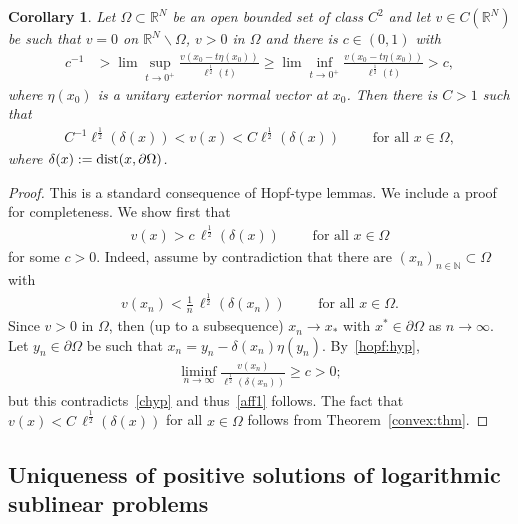 \documentclass[11pt]{article}
\newcommand{\R}{\mathbb{R}}
\newcommand{\N}{\mathbb{N}}
\numberwithin{equation}{section}
\newtheorem{corollary}[theorem]{Corollary}
\DeclareMathOperator{\dist}{\rm dist}
\begin{document}
\begin{corollary}\label{cor:hopf}
Let $\Omega\subset \R^N$ be an open bounded set of class $C^2$ and let $v\in C(\mathbb{R}^{N})$ be such that $v=0$ on $\R^N\backslash \Omega$, $v>0$ in $\Omega$ and there is $c\in(0,1)$ with
\begin{align}\label{hopf:hyp}
c^{-1}&>
\lim\sup_{t\to 0^+} \frac{v(x_0-t\eta(x_0))}{\ell^\frac{1}{2}(t)}
\geq 
\lim\inf_{t\to 0^+} \frac{v(x_0-t\eta(x_0))}{\ell^\frac{1}{2}(t)}>c,
\end{align}
where $\eta(x_0)$ is a unitary exterior normal vector at $x_0$. Then there is $C>1$ such that 
\begin{align*}
C^{-1}\ell^{\frac{1}{2}}(\delta(x))<
v(x)
<C\ell^{\frac{1}{2}}(\delta(x))
\qquad \text{ for all }x\in \Omega,
\end{align*}
where $\delta(x):=\dist(x,\partial \Omega)$.
\end{corollary}
\begin{proof} This is a standard consequence of Hopf-type lemmas. We include a proof for completeness. We show first that
\begin{align}\label{aff1}
v(x)>c\, \ell^{\frac{1}{2}}(\delta(x))\qquad \text{ for all }x\in \Omega
\end{align}
for some $c>0.$  Indeed, assume by contradiction that there are $(x_n)_{n\in\N}\subset\Omega$ with
\begin{align}\label{chyp}
v(x_n)<\frac{1}{n}\, \ell^{\frac{1}{2}}(\delta(x_n))\qquad \text{ for all }x\in \Omega.
\end{align}
Since $v>0$ in $\Omega$, then (up to a subsequence) $x_n\to x_*$ with $x^*\in\partial \Omega$ as $n\to \infty.$  Let $y_n\in \partial \Omega$ be such that $x_n=y_n-\delta(x_n)\eta(y_n)$. By~\eqref{hopf:hyp},
\begin{align*}
\liminf_{n\to\infty}\frac{v(x_n)}{\ell^{\frac{1}{2}}(\delta(x_n))}\geq c>0;
\end{align*}
but this contradicts~\eqref{chyp} and thus~\eqref{aff1} follows.  The fact that $v(x)<C\, \ell^{\frac{1}{2}}(\delta(x))$ for all $x\in \Omega$ follows from Theorem~\ref{convex:thm}.
\end{proof}




\subsection{Uniqueness of positive solutions of logarithmic sublinear problems}\label{sublin:sec}
 
\end{document}
